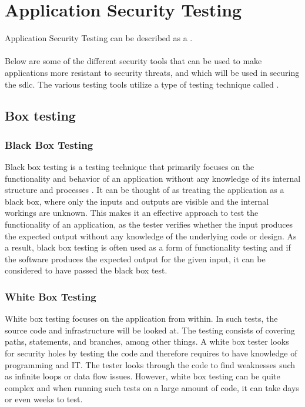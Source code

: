 \section{Application Security Testing}
Application Security Testing can be described as a  \cite{AST}.
\\~\\
Below are some of the different security tools that can be used to make applications more resistant to security threats, and which will be used in securing the \acrshort{sdlc}. 
The various testing tools utilize a type of testing technique called .

\subsection{Box testing}
\label{boxtesting}

\subsubsection{Black Box Testing}
\label{BlackBoxTesting}
Black box testing is a testing technique that primarily focuses on the functionality and behavior of an application without any knowledge of its internal structure and processes  \cite{blackbox}. It can be thought of as treating the application as a black box, where only the inputs and outputs are visible and the internal workings are unknown. This makes it an effective approach to test the functionality of an application, as the tester verifies whether the input produces the expected output without any knowledge of the underlying code or design. As a result, black box testing is often used as a form of functionality testing\cite{BlackBoxTestingFunctional} and if the software produces the expected output for the given input, it can be considered to have passed the black box test. 

\subsubsection{White Box Testing}
White box testing focuses on the application from within. In such tests, the source code and infrastructure will be looked at. The testing consists of covering paths, statements, and branches, among other things. A white box tester looks for security holes by testing the code and therefore requires to have knowledge of programming and IT. The tester looks through the code to find weaknesses such as infinite loops or data flow issues. However, white box testing can be quite complex and when running such tests on a large amount of code, it can take days or even weeks to test. \cite{whitebox}

